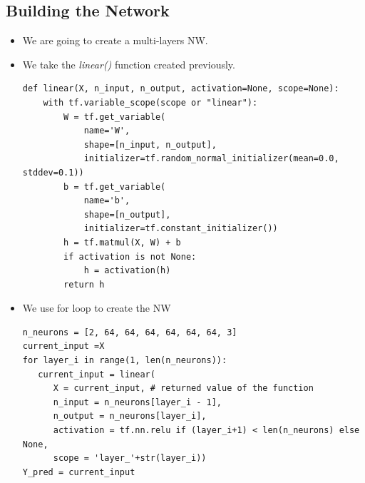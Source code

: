 \documentclass[12pt,a4paper]{article}
\begin{document}
\subsection{Building the Network}
\begin{itemize}
\item We are going to create a multi-layers NW.
\item We take the \textit{linear()} function created previously.
\begin{lstlisting}
def linear(X, n_input, n_output, activation=None, scope=None):
    with tf.variable_scope(scope or "linear"):
        W = tf.get_variable(
            name='W',
            shape=[n_input, n_output],
            initializer=tf.random_normal_initializer(mean=0.0, stddev=0.1))
        b = tf.get_variable(
            name='b',
            shape=[n_output],
            initializer=tf.constant_initializer())
        h = tf.matmul(X, W) + b
        if activation is not None:
            h = activation(h)
        return h
\end{lstlisting}
\item We use for loop to create the NW
\begin{lstlisting}
n_neurons = [2, 64, 64, 64, 64, 64, 64, 3]
current_input =X
for layer_i in range(1, len(n_neurons)):
   current_input = linear(
      X = current_input, # returned value of the function
      n_input = n_neurons[layer_i - 1],
      n_output = n_neurons[layer_i],
      activation = tf.nn.relu if (layer_i+1) < len(n_neurons) else None,
      scope = 'layer_'+str(layer_i))
Y_pred = current_input
\end{lstlisting}
\end{itemize}
\end{document}
